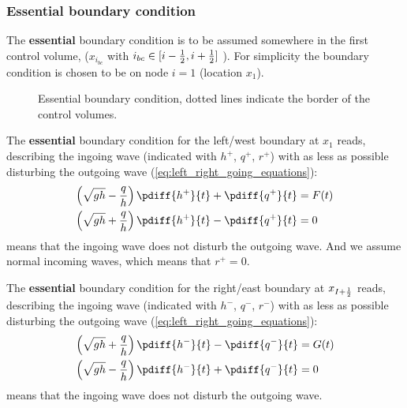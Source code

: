 \subsubsection{Essential boundary condition}
The \textbf{essential} boundary condition is to be assumed somewhere in the first control volume, ($x_{i_{bc}}$ with $i_{bc} \in [i-\frac{1}{2}, i+\frac{1}{2}]$ ).
For simplicity the boundary condition is chosen to be on node $i=1$ (location $x_{1}$).

\begin{figure}[H]
    \begin{center}
        \def\svgwidth{0.80\textwidth} %
        \resizebox{0.65\textwidth}{!}{
            
        }
    \end{center}
    \caption{Essential boundary condition, dotted lines indicate the border of the control volumes.}    \label{fig:structured_grid_along_straight_boundary_essential}
\end{figure}
The \textbf{essential} boundary condition for the left/west boundary at $x_{1}$ reads, describing the ingoing wave (indicated with $h^+$, $q^+$, $r^+$) with as less as possible disturbing the outgoing wave (\autoref{eq:left_right_going_equations}):
\begin{align}
    \left(\sqrt{gh} - \frac{q}{h}\right) \pdiff{h^{+}}{t} + \pdiff{q^{+}}{t} & = F(t)
    \label{eq:essential_conv_2d_1}
    \\
    \left(\sqrt{gh} + \frac{q}{h}\right) \pdiff{h^{+}}{t} - \pdiff{q^{+}}{t} & = 0
    \label{eq:essential_conv_2d_2}
\end{align}
 means that the ingoing wave does not disturb the outgoing wave.
And we assume normal incoming waves, which means that $r^+=0$.

The \textbf{essential} boundary condition for the right/east boundary at $x_{I+\frac{1}{2}}$ reads, describing the ingoing wave (indicated with $h^-$, $q^-$, $r^-$) with as less as possible disturbing the outgoing wave (\autoref{eq:left_right_going_equations}):\begin{align}
    \left(\sqrt{gh} + \frac{q}{h}\right) \pdiff{h^{-}}{t} - \pdiff{q^{-}}{t} & = G(t)
    \label{eq:essential_conv_2d_3}
    \\
    \left(\sqrt{gh} - \frac{q}{h}\right) \pdiff{h^{-}}{t} + \pdiff{q^{-}}{t} & = 0
    \label{eq:essential_conv_2d_4}
\end{align}
 means that the ingoing wave does not disturb the outgoing wave.
